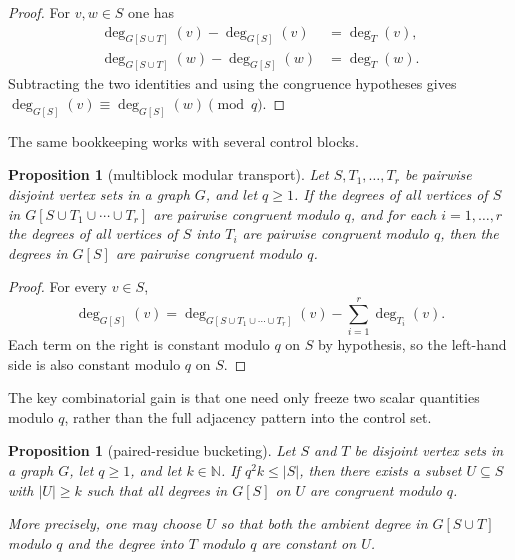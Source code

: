 \documentclass[11pt]{amsart}
\newtheorem{proposition}[theorem]{Proposition}
\theoremstyle{definition}
\newcommand{\N}{\mathbb{N}}
\begin{document}
\begin{proof}
For $v,w \in S$ one has
\begin{align*}
  \deg_{G[S \cup T]}(v)-\deg_{G[S]}(v) &= \deg_T(v), \\
  \deg_{G[S \cup T]}(w)-\deg_{G[S]}(w) &= \deg_T(w).
\end{align*}
Subtracting the two identities and using the congruence hypotheses gives
$\deg_{G[S]}(v) \equiv \deg_{G[S]}(w) \pmod q$.
\end{proof}

The same bookkeeping works with several control blocks.

\begin{proposition}[multiblock modular transport]\label{prop:multiblock-transport}
Let $S,T_1,\dots,T_r$ be pairwise disjoint vertex sets in a graph $G$, and let $q \ge 1$. If the
degrees of all vertices of $S$ in $G[S \cup T_1 \cup \cdots \cup T_r]$ are pairwise congruent
modulo $q$, and for each $i=1,\dots,r$ the degrees of all vertices of $S$ into $T_i$ are pairwise
congruent modulo $q$, then the degrees in $G[S]$ are pairwise congruent modulo $q$.
\end{proposition}

\begin{proof}
For every $v \in S$,
\[
  \deg_{G[S]}(v)
  =
  \deg_{G[S \cup T_1 \cup \cdots \cup T_r]}(v)-\sum_{i=1}^r \deg_{T_i}(v).
\]
Each term on the right is constant modulo $q$ on $S$ by hypothesis, so the left-hand side is also
constant modulo $q$ on $S$.
\end{proof}

The key combinatorial gain is that one need only freeze two scalar quantities modulo $q$, rather
than the full adjacency pattern into the control set.

\begin{proposition}[paired-residue bucketing]\label{prop:q2-bucketing}
Let $S$ and $T$ be disjoint vertex sets in a graph $G$, let $q \ge 1$, and let $k \in \N$. If
$q^2 k \le |S|$, then there exists a subset $U \subseteq S$ with $|U| \ge k$ such that all degrees
in $G[S]$ on $U$ are congruent modulo $q$.

More precisely, one may choose $U$ so that both the ambient degree in $G[S \cup T]$ modulo $q$ and
the degree into $T$ modulo $q$ are constant on $U$.
\end{proposition}
\end{document}

